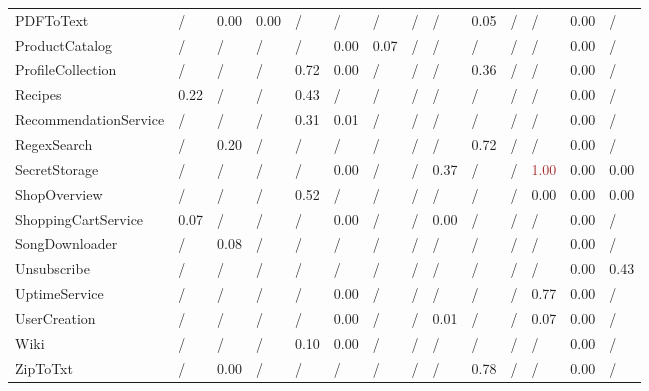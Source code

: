 \begin{table*}[h]
{\begin{tabular}{
l
x{1}{2}
x{1}{2}
x{1}{2}
x{1}{2}
x{1}{2}
x{1}{2}
x{1}{2}
x{1}{2}
x{1}{2}
x{1}{2}
x{1}{2}
x{1}{2}
x{1}{2}
}
PDFToText & / & 0.00 & 0.00 & / & / & / & / & / & 0.05 & / & / & 0.00 & / \\
ProductCatalog & / & / & / & / & 0.00 & 0.07 & / & / & / & / & / & 0.00 & / \\
ProfileCollection & / & / & / & 0.72 & 0.00 & / & / & / & 0.36 & / & / & 0.00 & / \\
Recipes & 0.22 & / & / & 0.43 & / & / & / & / & / & / & / & 0.00 & / \\
RecommendationService & / & / & / & 0.31 & 0.01 & / & / & / & / & / & / & 0.00 & / \\
RegexSearch & / & 0.20 & / & / & / & / & / & / & 0.72 & / & / & 0.00 & / \\
SecretStorage & / & / & / & / & 0.00 & / & / & 0.37 & / & / & \textcolor{brown}{1.00} & 0.00 & 0.00 \\
ShopOverview & / & / & / & 0.52 & / & / & / & / & / & / & 0.00 & 0.00 & 0.00 \\
ShoppingCartService & 0.07 & / & / & / & 0.00 & / & / & 0.00 & / & / & / & 0.00 & / \\
SongDownloader & / & 0.08 & / & / & / & / & / & / & / & / & / & 0.00 & / \\
Unsubscribe & / & / & / & / & / & / & / & / & / & / & / & 0.00 & 0.43 \\
UptimeService & / & / & / & / & 0.00 & / & / & / & / & / & 0.77 & 0.00 & / \\
UserCreation & / & / & / & / & 0.00 & / & / & 0.01 & / & / & 0.07 & 0.00 & / \\
Wiki & / & / & / & 0.10 & 0.00 & / & / & / & / & / & / & 0.00 & / \\
ZipToTxt & / & 0.00 & / & / & / & / & / & / & 0.78 & / & / & 0.00 & / \\
\bottomrule
\end{tabular}}
\end{table*}
